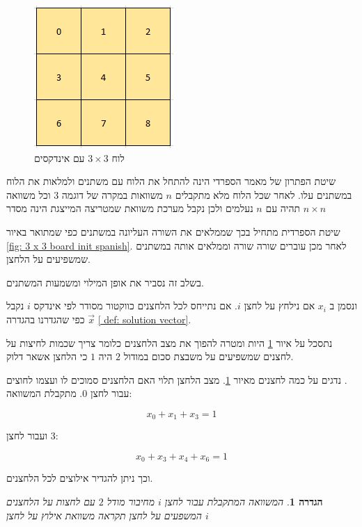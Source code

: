 \documentclass[12pt,twoside]{article}
\newtheorem{definition}{הגדרה}[section]
\begin{document}
\begin{figure}[ht]
    \caption{לוח 
    $3 \times 3$
    עם אינדקסים}
    \label{fig: 3 x 3 board indexed}
    \unsethebrew
    \centering
    \includegraphics[width=.3\textwidth,height=.3\textheight,keepaspectratio]{images/3x3_board_index.PNG}
\end{figure}
\sethebrew

שיטת הפתרון של מאמר הספרדי הינה להתחל את הלוח עם משתנים ולמלאות את הלוח במשתנים עלו.
לאחר שכל הלוח מלא מתקבלים 
$n$
משוואות במקרה של דוגמה 
$3$
וכל משוואה תהיה עם 
$n$
נעלמים
ולכן נקבל מערכת משוואת שמטריצה המייצגת הינה מסדר 
$n \times n$

שיטת הספרדית מתחיל בכך
שממלאים את השורה העליונה במשתנים
כפי שמתואר באיור 
\ref{fig: 3 x 3 board init spanish}.
לאחר מכן עוברים שורה שורה 
וממלאים אותה במשתנים שמשפיעים על הלחצן.

בשלב זה נסביר את אופן המילוי ומשמעות המשתנים.

ונסמן ב
$x_i$
אם נילחץ על לחצן 
$i$.
אם נתייחס לכל הלחצנים כווקטור מסודר לפי אינדקס
$i$
נקבל 
$\vec{x}$
כפי שהגדרנו בהגדרה 
\ref{ def: solution vector}.

נתסכל על איור 
\ref{fig: 3 x 3 board indexed}
היות ומטרה להפוך את מצב הלחצנים
כלומר צריך שכמות לחיצות על לחצנים שמשפיעים על 
משבצת סכום במודול
$2$
היה 
$1$
כי 
הלחצן אשאר דלוק.

נדגים
על כמה לחצנים מאיור  
\ref{fig: 3 x 3 board indexed}.
מצב הלחצן תלוי האם הלחצנים 
סמוכים לו  ועצמו לחוצים .
\\
עבור 
לחצן 
$0$.
מתקבלת המשוואה:

\[ x_0 + x_1 + x_3 = 1\]

ועבור לחצן 
$3$:

\[ x_0 + x_3 + x_4 + x_6 = 1 \]

וכך ניתן להגדיר אילוצים לכל הלחצנים.

\begin{definition}
    \label{ def: depndeciy equation}
    המשוואה המתקבלת
    עבור לחצן 
    $i$
    מחיבור מודל 
    $2$
    עם לחצות על הלחצנים המשפעים על לחצן 
    תקראה
    משוואת אילוץ על לחצן 
    $i$
\end{definition}
\end{document}
